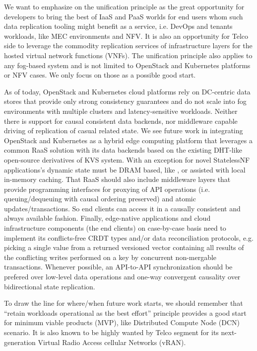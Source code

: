 \documentclass[conference]{IEEEtran}
\begin{document}
We want to emphasize on the unification principle as the great opportunity for
developers to bring the best of IaaS and PaaS worlds for end users whom such
data replication tooling might benefit as a service, i.e. DevOps and tenants
workloads, like MEC environments and NFV. It is also an opportunity for Telco
side to leverage the commodity replication services of infrastructure layers
for the hosted virtual network functions (VNFs). The unification principle also
applies to any fog-based system and is not limited to OpenStack and Kubernetes
platforms or NFV cases. We only focus on those as a possible good start.

As of today, OpenStack and Kubernetes cloud platforms rely on DC-centric data
stores that provide only strong consistency guarantees and do not scale into
fog environments with multiple clusters and latency-sensitive workloads.
Neither there is support for causal consistent data backends, nor middleware
capable driving of replication of casual related state. We see future work in
integrating OpenStack and Kubernetes as a hybrid edge computing platform that
leverages a common RaaS solution with its data backends based on the existing
DHT-like open-source derivatives of\cite{b17} KVS system. With an exception for
novel StatelessNF applications's dynamic state must be DRAM based, like
\cite{b18}, or assisted with local in-memory caching. That RaaS should also
include middleware layers that provide programming interfaces for proxying of
API operations (i.e. queuing/dequeuing with causal ordering preserved) and
atomic updates/transactions\cite{b1}. So end clients can access it in a
causally consistent and always available fashion. Finally, edge-native
applications and cloud infrastructure components (the end clients) on
case-by-case basis need to implement its conflicts-free CRDT types and/or data
reconciliation protocols, e.g. picking a single value from a returned versioned
vector containing all results of the conflicting writes performed on a key by
concurrent non-mergable transactions. Whenever possible, an API-to-API
synchronization should be prefered over low-level data operations and one-way
convergent causality over bidirectional state replication.

To draw the line for where/when future work starts, we should remember
that ``retain workloads operational as the best effort'' principle provides a
good start for minimum viable products (MVP), like Distributed Compute Node
(DCN) scenario. It is also known to be highly wanted by Telco segment for its
next-generation Virtual Radio Access cellular Networks (vRAN).
\end{document}

